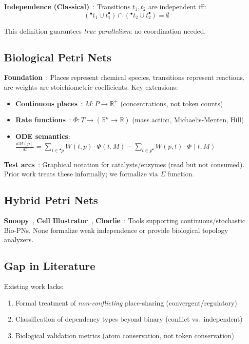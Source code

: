 \documentclass[runningheads]{llncs}
\newcommand{\preset}[1]{\ensuremath{{}^{\bullet}#1}}
\newcommand{\postset}[1]{\ensuremath{#1^{\bullet}}}
\begin{document}
\textbf{Independence (Classical)}~\cite{Reisig2013}: Transitions $t_1, t_2$ are independent iff:
\begin{equation}
(\preset{t_1} \cup \postset{t_1}) \cap (\preset{t_2} \cup \postset{t_2}) = \emptyset
\label{eq:classical_independence}
\end{equation}

This definition guarantees \emph{true parallelism}: no coordination needed.

\subsection{Biological Petri Nets}

\textbf{Foundation}~\cite{Reddy1993}: Places represent chemical species, transitions represent reactions, arc weights are stoichiometric coefficients. Key extensions:
\begin{itemize}
    \item \textbf{Continuous places}~\cite{Heiner2008}: $M: P \to \mathbb{R}^+$ (concentrations, not token counts)
    \item \textbf{Rate functions}~\cite{Gilbert2006}: $\Phi: T \to (\mathbb{R}^n \to \mathbb{R})$ (mass action, Michaelis-Menten, Hill)
    \item \textbf{ODE semantics}: $\frac{dM(p)}{dt} = \sum_{t \in \preset{p}} W(t,p) \cdot \Phi(t, M) - \sum_{t \in \postset{p}} W(p,t) \cdot \Phi(t, M)$
\end{itemize}

\textbf{Test arcs}~\cite{Koch2011}: Graphical notation for catalysts/enzymes (read but not consumed). Prior work treats these informally; we formalize via $\Sigma$ function.

\subsection{Hybrid Petri Nets}

\textbf{Snoopy}~\cite{Heiner2015}, \textbf{Cell Illustrator}~\cite{Nagasaki2011}, \textbf{Charlie}~\cite{Heiner2009}: Tools supporting continuous/stochastic Bio-PNs. None formalize weak independence or provide biological topology analyzers.

\subsection{Gap in Literature}

Existing work lacks:
\begin{enumerate}
    \item Formal treatment of \emph{non-conflicting} place-sharing (convergent/regulatory)
    \item Classification of dependency types beyond binary (conflict vs.\ independent)
    \item Biological validation metrics (atom conservation, not token conservation)
\end{enumerate}
\end{document}

